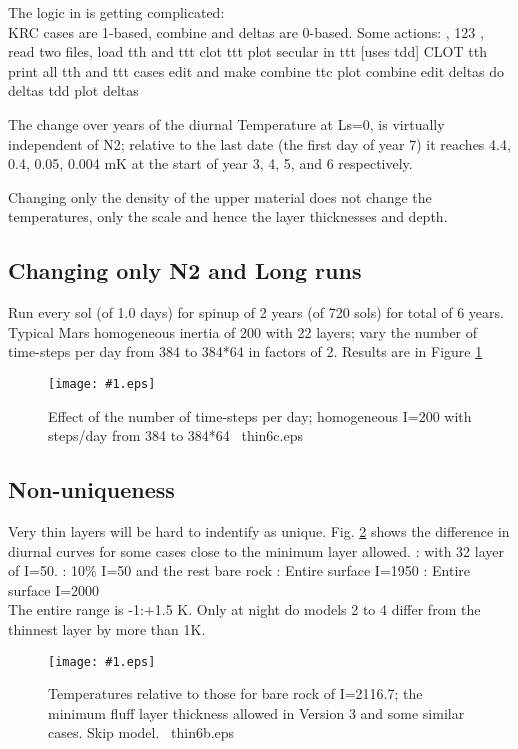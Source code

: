 \documentclass{article}  %
\newcommand{\igc}[1]{\texttt{[image: \#1.eps]}}  %
\begin{document}
The logic in  is getting complicated:
\\ KRC cases are 1-based, combine and deltas are 0-based. Some actions:
, 123 , read two files, load tth and ttt
 clot ttt
 plot secular in ttt [uses tdd]
 CLOT tth
 print all tth and ttt cases
 edit  and make combine ttc
  plot combine
  edit deltas
  do deltas tdd
  plot deltas

The change over years of the diurnal Temperature at Ls=0, is virtually
independent of N2; relative to the last date (the first day of year 7) it
reaches 4.4, 0.4, 0.05, 0.004 mK at the start of year 3, 4, 5, and 6
respectively.

Changing only the density of the upper material does not change the
temperatures, only the scale and hence the layer thicknesses and depth.

\clearpage
\subsection{Changing only N2 and Long runs} %
Run every sol (of 1.0 days) for spinup of 2 years (of 720 sols) for total of 6
years. Typical Mars homogeneous inertia of 200 with 22 layers; vary the number
of time-steps per day from 384 to 384*64 in factors of 2. Results are in Figure
\ref{thin6c}

\begin{figure}[!ht] \igc{thin6c}
\caption[N2 only]{Effect of the number of time-steps per day; homogeneous I=200
  with steps/day from 384 to 384*64 \ thin6c.eps \label{thin6c} } \end{figure}

\clearpage
\subsection{Non-uniqueness}

Very thin layers will be hard to indentify as unique. Fig. \ref{thin6b} shows 
the difference in diurnal curves for some cases close to the minimum layer allowed.
: with 32 \um layer of I=50.
: 10\% I=50 and the rest bare rock
: Entire surface I=1950
: Entire surface I=2000
\\ The entire range is -1:+1.5 K. Only at night do models 2 to 4 differ from the thinnest layer by more than 1K.

\begin{figure}[!ht] \igc{thin6b}
\caption[Similar to thinnest]{Temperatures relative to those for bare rock of I=2116.7; the minimum fluff layer thickness allowed in Version 3 and some similar cases.  Skip model.  \ thin6b.eps \label{thin6b} } \end{figure}
\end{document}
